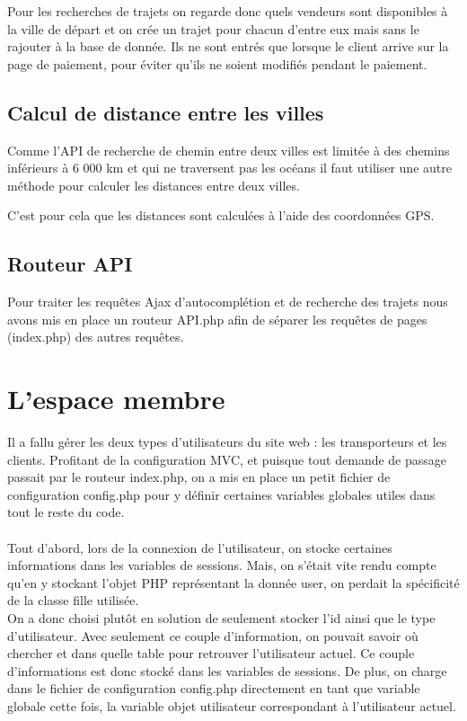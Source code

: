 \documentclass{article}
\begin{document}
        Pour les recherches de trajets on regarde donc quels vendeurs sont disponibles à la ville de départ et on crée un trajet pour chacun d'entre eux mais sans le rajouter à la base de donnée. Ils ne sont entrés que lorsque le client arrive sur la page de paiement, pour éviter qu'ils ne soient modifiés pendant le paiement.
    
    \subsection{Calcul de distance entre les villes}
        Comme l'API de recherche de chemin entre deux villes est limitée à des chemins inférieurs à 6 000 km et qui ne traversent pas les océans il faut utiliser une autre méthode pour calculer les distances entre deux villes.
        
        C'est pour cela que les distances sont calculées à l'aide des coordonnées GPS.
    \subsection{Routeur API}
        Pour traiter les requêtes Ajax d'autocomplétion et de recherche des trajets nous avons mis en place un routeur API.php afin de séparer les requêtes de pages (index.php) des autres requêtes. 
            
    \section{L'espace membre}
Il a fallu gérer les deux types d'utilisateurs du site web : les transporteurs et les clients. Profitant de la configuration MVC, et puisque tout demande de passage passait par le routeur index.php, on a mis en place un petit fichier de configuration config.php pour y définir certaines variables globales utiles dans tout le reste du code. 
\\
\\
Tout d'abord, lors de la connexion de l'utilisateur, on stocke certaines informations dans les variables de sessions. Mais, on s'était vite rendu compte qu'en y stockant l'objet PHP représentant la donnée user, on perdait la spécificité de la classe fille utilisée. 
\\ 
On a donc choisi plutôt en solution de seulement stocker l'id ainsi que le type d'utilisateur. Avec seulement ce couple d'information, on pouvait savoir où chercher et dans quelle table pour retrouver l'utilisateur actuel. Ce couple d'informations est donc stocké dans les variables de sessions. De plus, on charge dans le fichier de configuration config.php directement en tant que variable globale cette fois, la variable objet utilisateur correspondant à l'utilisateur actuel. 
\end{document}
